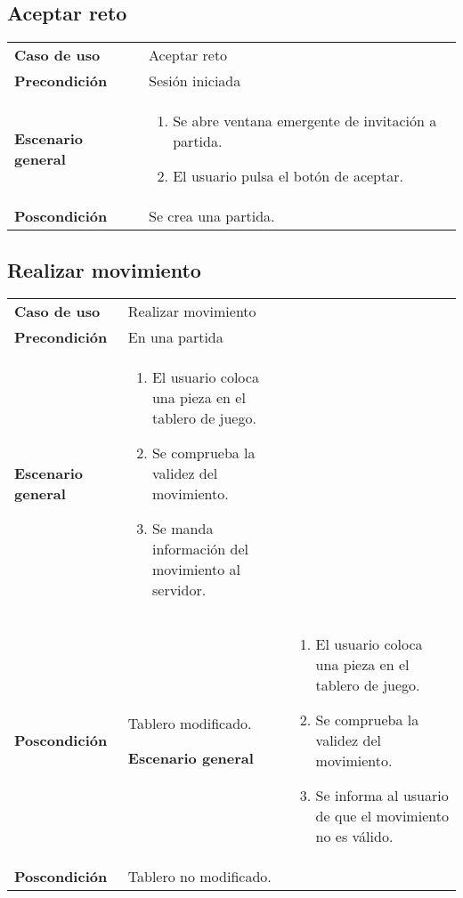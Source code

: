 \subsection{Aceptar reto}
{\footnotesize
\begin{tabularx}{0.95\textwidth}{p{}|X}

\textbf{Caso de uso} & Aceptar reto \\

\textbf{Precondición} & Sesión iniciada \\

\textbf{Escenario general} & \begin{enumerate}
\item Se abre ventana emergente de invitación a partida.
\item El usuario pulsa el botón de aceptar.

\end{enumerate} \\

\textbf{Poscondición} & Se crea una partida.

\end{tabularx}
}

\subsection{Realizar movimiento}
{\footnotesize
\begin{tabularx}{0.95\textwidth}{p{}|X}

\textbf{Caso de uso} & Realizar movimiento \\

\textbf{Precondición} & En una partida \\

\textbf{Escenario general} & \begin{enumerate}
\item El usuario coloca una pieza en el tablero de juego.
\item Se comprueba la validez del movimiento.
\item Se manda información del movimiento al servidor.

\end{enumerate} \\

\textbf{Poscondición} & Tablero modificado.

\textbf{Escenario general} & \begin{enumerate}
\item El usuario coloca una pieza en el tablero de juego.
\item Se comprueba la validez del movimiento.
\item Se informa al usuario de que el movimiento no es válido.

\end{enumerate} \\

\textbf{Poscondición} & Tablero no modificado.

\end{tabularx}
}

